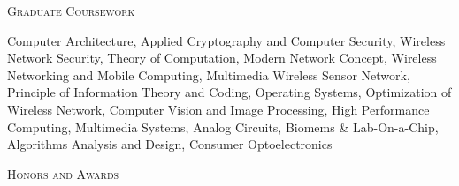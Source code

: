 \documentclass[letter]{article}
\newcommand{\heading}[1]{\item \large \textsc{#1} \normalsize}
\begin{document}
\begin{description}
\heading{Graduate Coursework}

Computer Architecture, Applied Cryptography and Computer Security, Wireless Network Security, Theory of Computation, Modern Network Concept, Wireless Networking and Mobile Computing, Multimedia Wireless Sensor Network, Principle of Information Theory and Coding, Operating Systems, Optimization of Wireless Network, Computer Vision and Image Processing, High Performance Computing, Multimedia Systems, Analog Circuits, Biomems \& Lab-On-a-Chip, Algorithms Analysis and Design, Consumer Optoelectronics\\
\heading{Honors and Awards}



\end{description}
\end{document}

